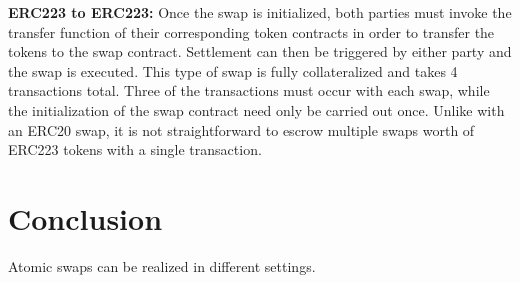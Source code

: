 \textbf{ERC223 to ERC223:} Once the swap is initialized, both parties must invoke the transfer function of their corresponding token contracts in order to transfer the tokens to the swap contract. Settlement can then be triggered by either party and the swap is executed. This type of swap is fully collateralized and takes 4 transactions total. Three of the transactions must occur with each swap, while the initialization of the swap contract need only be carried out once. Unlike with an ERC20 swap, it is not straightforward to escrow multiple swaps worth of ERC223 tokens with a single transaction.

\section{Conclusion}
Atomic swaps can be realized in different settings.
